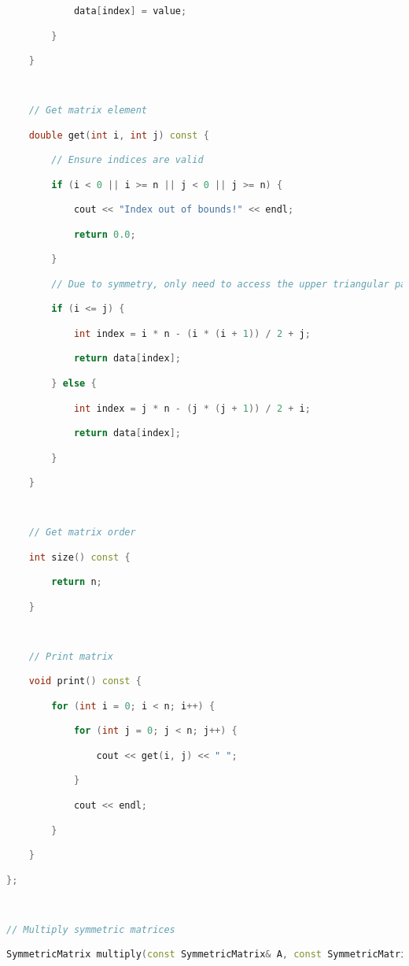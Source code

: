 \begin{lstlisting}[language=C++]
            data[index] = value;

        }

    }

  

    // Get matrix element

    double get(int i, int j) const {

        // Ensure indices are valid

        if (i < 0 || i >= n || j < 0 || j >= n) {

            cout << "Index out of bounds!" << endl;

            return 0.0;

        }

        // Due to symmetry, only need to access the upper triangular part

        if (i <= j) {

            int index = i * n - (i * (i + 1)) / 2 + j;

            return data[index];

        } else {

            int index = j * n - (j * (j + 1)) / 2 + i;

            return data[index];

        }

    }

  

    // Get matrix order

    int size() const {

        return n;

    }

  

    // Print matrix

    void print() const {

        for (int i = 0; i < n; i++) {

            for (int j = 0; j < n; j++) {

                cout << get(i, j) << " ";

            }

            cout << endl;

        }

    }

};

  

// Multiply symmetric matrices

SymmetricMatrix multiply(const SymmetricMatrix& A, const SymmetricMatrix& B) {


\end{lstlisting}
